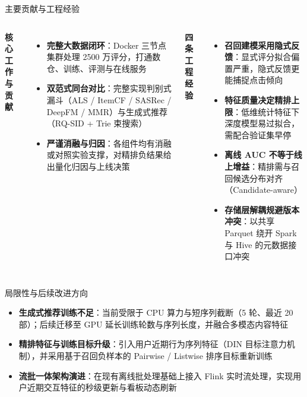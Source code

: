 \documentclass[aspectratio=169,11pt,fontset=none]{ctexbeamer}
\begin{document}
\begin{frame}{主要贡献与工程经验}
  \begin{columns}[T]
    \small
    \textbf{核心工作与贡献}\\[2pt]
    \begin{itemize}
      \item \textbf{完整大数据闭环}：Docker 三节点集群处理 2500 万评分，打通数仓、训练、评测与在线服务
      \item \textbf{双范式同台对比}：完整实现判别式漏斗（ALS / ItemCF / SASRec / DeepFM / MMR）与生成式推荐（RQ-SID + Trie 束搜索）
      \item \textbf{严谨消融与归因}：各组件均有消融或对照实验支撑，对精排负结果给出量化归因与上线决策
    \end{itemize}
    \small
    \textbf{四条工程经验}\\[2pt]
    \begin{itemize}
      \item \textbf{召回建模采用隐式反馈}：显式评分拟合偏置严重，隐式反馈更能捕捉点击倾向
      \item \textbf{特征质量决定精排上限}：低维统计特征下深度模型易过拟合，需配合验证集早停
      \item \textbf{离线 AUC 不等于线上增益}：精排需与召回候选分布对齐（Candidate-aware）
      \item \textbf{存储层解耦规避版本冲突}：以共享 Parquet 绕开 Spark 与 Hive 的元数据接口冲突
    \end{itemize}
  \end{columns}
\end{frame}

\begin{frame}{局限性与后续改进方向}
  \small
  \begin{itemize}
    \item \textbf{生成式推荐训练不足}：当前受限于 CPU 算力与短序列截断（5 轮、最近 20 部）；后续迁移至 GPU 延长训练轮数与序列长度，并融合多模态内容特征
    \item \textbf{精排特征与训练目标升级}：引入用户近期行为序列特征（DIN 目标注意力机制），并采用基于召回负样本的 Pairwise / Listwise 排序目标重新训练
    \item \textbf{流批一体架构演进}：在现有离线批处理基础上接入 Flink 实时流处理，实现用户近期交互特征的秒级更新与看板动态刷新
  \end{itemize}
  \vspace{12pt}
\end{frame}
\end{document}
